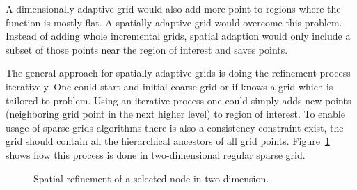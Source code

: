 A dimensionally adaptive grid would also add more point to regions where the function is mostly flat.
A spatially adaptive grid would overcome this problem. Instead of adding whole incremental grids,
spatial adaption would only include a subset of those points near the region of interest and saves points.

The general approach for spatially adaptive grids is doing the refinement process iteratively.
One could start and initial coarse grid or if knows a grid which is tailored to problem. Using an iterative process
one could simply adds new points (neighboring grid point in the next higher level) to region of interest. To enable usage
of sparse grids algorithms there is also a consistency constraint exist, the grid should contain all the hierarchical
ancestors of all grid points. Figure~\ref{fig:spatialrefiment} shows how this process is done in two-dimensional regular sparse grid.

\begin{figure}
    \centering
    \caption{Spatial refinement of a selected node in two dimension.}
    \label{fig:spatialrefiment}
\end{figure}